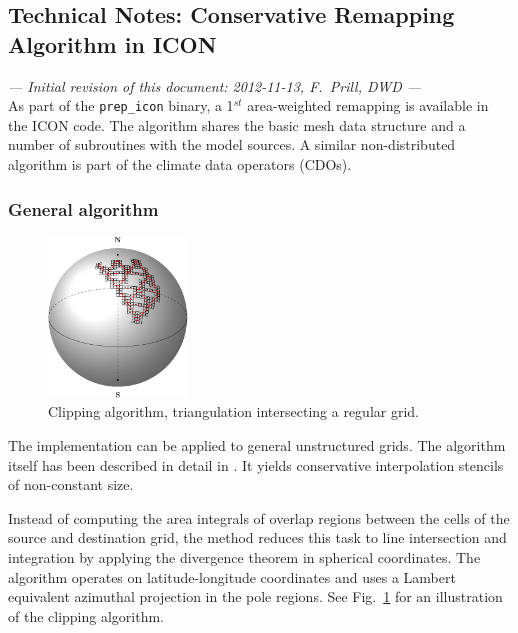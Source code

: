 \documentclass[a4paper,10pt, DIV14]{scrartcl}
\begin{document}
\subsection*{Technical Notes: Conservative Remapping Algorithm in ICON}

\emph{--- Initial revision of this document: 2012-11-13, F.\ Prill, DWD ---}\\

As part of the \texttt{prep\_icon} binary, a 1$^{st}$ area-weighted remapping
is available in the ICON code.
The algorithm shares the basic mesh data structure and a number of subroutines with the 
model sources.
A similar non-distributed algorithm is part of the climate data operators (CDOs).


\subsubsection*{General algorithm}

\begin{figure}
 \begin{center}
  \includegraphics[width=0.33\textwidth]{remap_intersect.pdf}
 \end{center}
 \setcaphanging
 \setcapindent*{2em}
 \caption{Clipping algorithm, triangulation intersecting a regular grid.}
 \label{fig:intersection}
\end{figure}

The implementation can be applied to general unstructured grids. 
The algorithm itself has been described in detail in \cite{Jones1999}.
It yields conservative interpolation stencils of non-constant size.

Instead of computing the area integrals of overlap regions between the cells of the
source and destination grid, the method reduces this task to line
intersection and integration by applying the divergence theorem in spherical coordinates.
The algorithm operates on latitude-longitude coordinates and uses a
Lambert equivalent azimuthal projection in the pole regions.
See Fig.~\ref{fig:intersection} for an illustration of the clipping algorithm.
\end{document}
